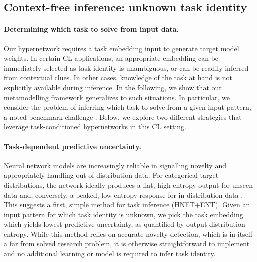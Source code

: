 \documentclass{article}
\begin{document}
\subsection{Context-free inference: unknown task identity}
\label{sect:rr}
\paragraph{Determining which task to solve from input data.} Our hypernetwork requires a task embedding input to generate target model weights. In certain CL applications, an appropriate embedding can be immediately selected as task identity is unambiguous, or can be readily inferred from contextual clues. In other cases, knowledge of the task at hand is not explicitly available during inference. In the following, we show that our metamodelling framework generalizes to such situations. In particular, we consider the problem of inferring which task to solve from a given input pattern, a noted benchmark challenge \citep{farquhar_towards_2018,van_de_ven_three_2019}. Below, we explore two different strategies that leverage task-conditioned hypernetworks in this CL setting.

\vspace{-2mm}
\paragraph{Task-dependent predictive uncertainty.} Neural network models are increasingly reliable in signalling novelty and appropriately handling out-of-distribution data. For categorical target distributions, the network ideally produces a flat, high entropy output for unseen data and, conversely, a peaked, low-entropy response for in-distribution data \citep{hendrycks2016baseline,liang2017enhancing}. This suggests a first, simple method for task inference (HNET+ENT). Given an input pattern for which task identity is unknown, we pick the task embedding which yields lowest predictive uncertainty, as quantified by output distribution entropy. While this method relies on accurate novelty detection, which is in itself a far from solved research problem, it is otherwise straightforward to implement and no additional learning or model is required to infer task identity.

\vspace{-2mm}
\end{document}
